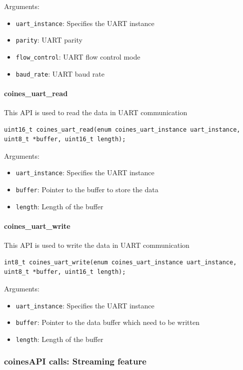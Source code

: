 Arguments:
\begin{itemize}
	\item \texttt{uart\_instance}: Specifies the UART instance
	\item \texttt{parity}: UART parity
	\item \texttt{flow\_control}: UART flow control mode
	\item \texttt{baud\_rate}:  UART baud rate
\end{itemize}

\paragraph{coines\_uart\_read}
This API is used to read the data in UART communication

\begin{lstlisting}
uint16_t coines_uart_read(enum coines_uart_instance uart_instance, uint8_t *buffer, uint16_t length);
\end{lstlisting}

Arguments:
\begin{itemize}
	\item \texttt{uart\_instance}: Specifies the UART instance
	\item \texttt{buffer}: Pointer to the buffer to store the data
	\item \texttt{length}: Length of the buffer
\end{itemize}

\paragraph{coines\_uart\_write}
This API is used to write the data in UART communication

\begin{lstlisting}
int8_t coines_uart_write(enum coines_uart_instance uart_instance, uint8_t *buffer, uint16_t length);
\end{lstlisting}

Arguments:
\begin{itemize}
	\item \texttt{uart\_instance}: Specifies the UART instance
	\item \texttt{buffer}: Pointer to the data buffer which need to be written
	\item \texttt{length}: Length of the buffer
\end{itemize}

\subsubsection{coinesAPI calls: Streaming feature}

